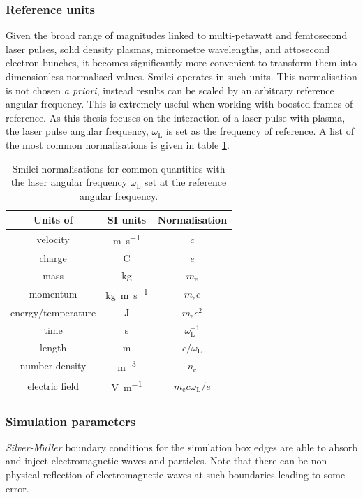 \subsubsection{Reference units}
Given the broad range of magnitudes linked to multi-petawatt and femtosecond laser pulses, solid density plasmas, micrometre wavelengths, and attosecond electron bunches, it becomes significantly more convenient to transform them into dimensionless normalised values. Smilei operates in such units. This normalisation is not chosen \textit{a priori}, instead results can be scaled by an arbitrary reference angular frequency. This is extremely useful when working with boosted frames of reference. As this thesis focuses on the interaction of a laser pulse with plasma, the laser pulse angular frequency, $\omega_\mathrm{L}$ is set as the frequency of reference. A list of the most common normalisations is given in table \ref{tab:intro-normalisations}.

\begin{table}
	\begin{center}
		\begin{tabular}{ccc}
			\hline \hline
			Units of & SI units & Normalisation \\
			\hline
			velocity & \unit{m.s^{-1}} & $c$ \\
			charge & C & $e$ \\
			mass & kg & $m_\mathrm{e}$ \\
			momentum & \unit{kg.m.s^{-1}} & $m_\mathrm{e}c$ \\
			energy/temperature & J & $m_\mathrm{e}c^2$ \\
			time & s & $\omega^{-1}_\mathrm{L}$ \\
			length & m & $c/\omega_\mathrm{L}$ \\
			number density & \unit{m^{-3}} & $n_\mathrm{c}$ \\
			electric field & \unit{V.m^{-1}} & $m_\mathrm{e}c\omega_\mathrm{L}/e$ \\
			\hline \hline
		\end{tabular}
		\caption{\label{tab:intro-normalisations} Smilei normalisations for common quantities with the laser angular frequency $\omega_\mathrm{L}$ set at the reference angular frequency.}
	\end{center}
\end{table}

\subsubsection{Simulation parameters}\label{sec:intro-general_simulation_paramers}
\textit{Silver-M$\ddot{u}$ller} boundary conditions for the simulation box edges \cite{barucqAsymptoticBehaviorSolutions1997} are able to absorb and inject electromagnetic waves and particles. Note that there can be non-physical reflection of electromagnetic waves at such boundaries leading to some error.

